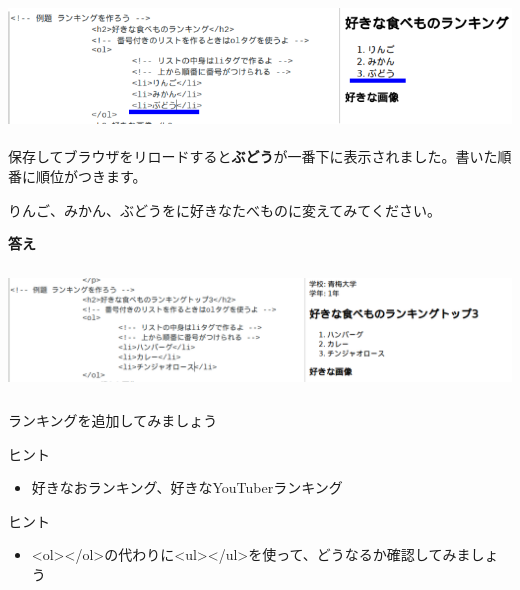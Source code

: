 \documentclass[a4paper,12pt]{jarticle}
\begin{document}
\bigskip


\includegraphics[width=15cm,height=3.327cm]{textbook-img183.png}


\bigskip


保存してブラウザをリロードすると\textbf{ぶどう}が一番下に表示されました。書いた順番に順位がつきます。

りんご、みかん、ぶどうをに好きなたべものに変えてみてください。


\bigskip
\clearpage
\textbf{答え}


\bigskip



\includegraphics[width=15.905cm,height=3.3cm]{textbook-img184.png}


\bigskip


\bigskip


\bigskip


\theQuestion\label{Q:hasAnswer04-6}

ランキングを追加してみましょう

ヒント

\begin{itemize}
  \item
        好きなおランキング、好きなYouTuberランキング
\end{itemize}


\bigskip

\bigskip

\theQuestion\label{Q:hasAnswer04-7}

ヒント

\begin{itemize}
  \item
        {\textless}ol{\textgreater}{\textless}/ol{\textgreater}の代わりに{\textless}ul{\textgreater}{\textless}/ul{\textgreater}を使って、どうなるか確認してみましょう
\end{itemize}
\end{document}

